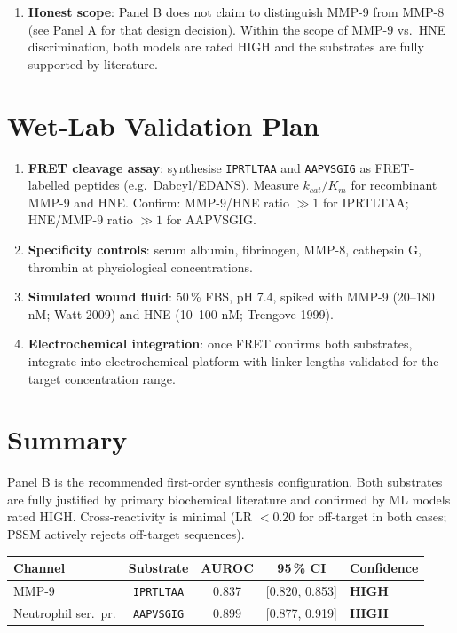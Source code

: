 \documentclass[10pt,a4paper]{article}
\newcommand{\seq}[1]{\texttt{#1}}
\newcommand{\hi}[1]{\textcolor{highgreen}{\textbf{#1}}}
\begin{document}
\begin{enumerate}[leftmargin=*,label=\textbf{D\arabic*.},topsep=3pt,itemsep=3pt]
  \item \textbf{Honest scope}: Panel B does not claim to distinguish
    MMP-9 from MMP-8 (see Panel A for that design decision).  Within
    the scope of MMP-9 vs.\ HNE discrimination, both models are rated
    HIGH and the substrates are fully supported by literature.

\end{enumerate}

\section{Wet-Lab Validation Plan}

\begin{enumerate}[leftmargin=*,topsep=2pt,itemsep=2pt]
  \item \textbf{FRET cleavage assay}: synthesise \seq{IPRTLTAA} and
    \seq{AAPVSGIG} as FRET-labelled peptides (e.g.\ Dabcyl/EDANS).
    Measure $k_{cat}/K_m$ for recombinant MMP-9 and HNE.
    Confirm: MMP-9/HNE ratio $\gg 1$ for IPRTLTAA;
    HNE/MMP-9 ratio $\gg 1$ for AAPVSGIG.
  \item \textbf{Specificity controls}: serum albumin, fibrinogen,
    MMP-8, cathepsin G, thrombin at physiological concentrations.
  \item \textbf{Simulated wound fluid}: 50\,\% FBS, pH 7.4,
    spiked with MMP-9 (20--180 nM; Watt 2009) and HNE
    (10--100 nM; Trengove 1999).
  \item \textbf{Electrochemical integration}: once FRET confirms both
    substrates, integrate into electrochemical platform with linker
    lengths validated for the target concentration range.
\end{enumerate}

\section{Summary}

Panel B is the recommended first-order synthesis configuration.
Both substrates are fully justified by primary biochemical literature
and confirmed by ML models rated HIGH.  Cross-reactivity is minimal
(LR $< 0.20$ for off-target in both cases; PSSM actively rejects
off-target sequences).

\begin{center}
\small
\begin{tabular}{lcccl}
  \toprule
  Channel & Substrate & AUROC & 95\,\% CI & Confidence\\
  \midrule
  MMP-9 & \seq{IPRTLTAA} & 0.837 & [0.820, 0.853] & \hi{HIGH}\\
  Neutrophil ser.\ pr. & \seq{AAPVSGIG} & 0.899 & [0.877, 0.919] & \hi{HIGH}\\
  \bottomrule
\end{tabular}
\end{center}
\end{document}

